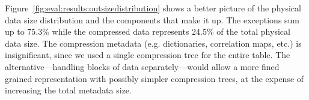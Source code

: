 Figure~\ref{fig:eval:results:outsizedistribution} shows a better picture of the physical data size distribution and the components that make it up. The exceptions sum up to 75.3\% while the compressed data represents 24.5\% of the total physical data size. The compression metadata (e.g. dictionaries, correlation maps, etc.) is insignificant, since we used a single compression tree for the entire table. The alternative---handling blocks of data separately---would allow a more fined grained representation with possibly simpler compression trees, at the expense of increasing the total metadata size.

\begin{figure}[h]
\centering
{}
\end{figure}

